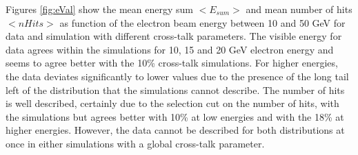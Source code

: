 Figures \ref{fig:eVal} show the mean energy sum $<E_{sum}>$ and mean number of hits $<nHits>$ as function of the electron beam energy between 10 and 50 GeV for data and simulation with different cross-talk parameters. The visible energy for data agrees within the simulations for 10, 15 and 20 GeV electron energy and seems to agree better with the 10\% cross-talk simulations. For higher energies, the data deviates significantly to lower values due to the presence of the long tail left of the distribution that the simulations cannot describe. The number of hits is well described, certainly due to the selection cut on the number of hits, with the simulations but agrees better with 10\% at low energies and with the 18\% at higher energies. However, the data cannot be described for both distributions at once in either simulations with a global cross-talk parameter.

